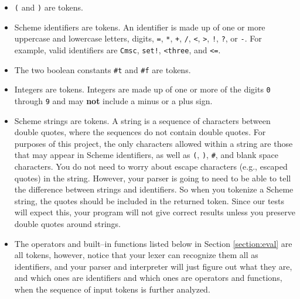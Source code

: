 \documentclass[11pt]{article}
\begin{document}
    \begin{itemize}

      \addtolength{\itemsep}{-1.5mm}

      \item \texttt{(} and \texttt{)} are tokens.

      \item Scheme identifiers are tokens.  An identifier is made up of one
            or more uppercase and lowercase letters, digits, \texttt{=},
            \texttt{*}, \texttt{+}, \texttt{/}, \texttt{<}, \texttt{>},
            \texttt{!}, \texttt{?}, or \texttt{-}.  For example, valid
            identifiers are \texttt{Cmsc}, \texttt{set!}, \texttt{<three},
            and \texttt{<=}.

      \item The two boolean constants \texttt{\#t} and \texttt{\#f} are
            tokens.

      \item Integers are tokens.  Integers are made up of one or more of the
            digits \texttt{0} through \texttt{9} and may \textbf{not}
            include a minus or a plus sign.

      \item Scheme strings are tokens.  A string is a sequence of characters
            between double quotes, where the sequences do not contain double
            quotes.  For purposes of this project, the only characters
            allowed within a string are those that may appear in Scheme
            identifiers, as well as \texttt{(}, \texttt{)}, \texttt{\#}, and
            blank space characters.  You do not need to worry about escape
            characters (e.g., escaped quotes) in the string.  However, your
            parser is going to need to be able to tell the difference
            between strings and identifiers.  So when you tokenize a Scheme
            string, the quotes should be included in the returned token.
            Since our tests will expect this, your program will not give
            correct results unless you preserve double quotes around
            strings.

      \item The operators and built--in functions listed below in Section
            \ref{section:eval} are all tokens, however, notice that your
            lexer can recognize them all as identifiers, and your parser and
            interpreter will just figure out what they are, and which ones
            are identifiers and which ones are operators and functions, when
            the sequence of input tokens is further analyzed.

    \end{itemize}
\end{document}
